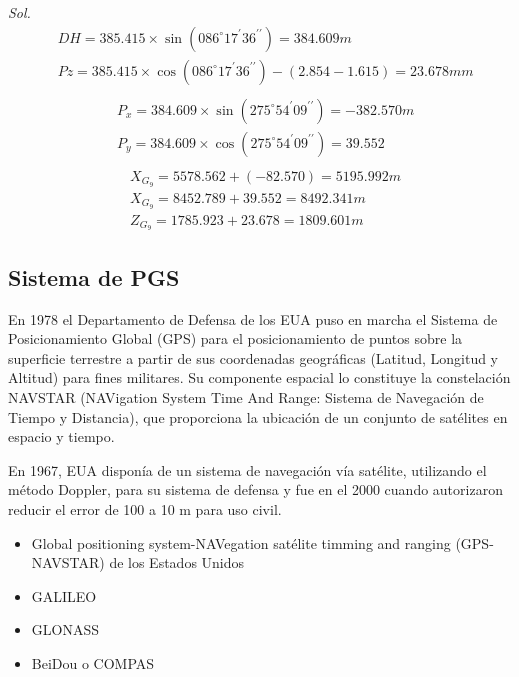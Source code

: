\textit{ Sol. }
\begin{align*}
    &DH = 385.415 \times \sin{(086^{\circ} 17^{\prime} 36^{\prime\prime})} = 384.609m\\
    &Pz = 385.415 \times \cos{(086^{\circ} 17^{\prime} 36^{\prime\prime})} -(2.854 - 1.615) = 23.678mm\\
\end{align*}
\begin{align*}
    &P_x = 384.609 \times \sin{(275^{\circ} 54^{\prime} 09^{\prime\prime})} = - 382.570m\\
    &P_y = 384.609 \times \cos{(275^{\circ} 54^{\prime} 09^{\prime\prime})} = 39.552\\
\end{align*}
\begin{align*}
    &X_{G_9} = 5578.562 +( - 82.570) = 5195.992m\\
    &X_{G_9} = 8452.789 + 39.552 = 8492.341m\\
    &Z_{G_9} = 1785.923 + 23.678 =1809.601m
\end{align*}



\subsection{Sistema de PGS}

En 1978 el Departamento de Defensa de los EUA puso en marcha el Sistema de Posicionamiento Global (GPS) para el posicionamiento de puntos sobre la superficie terrestre a partir de sus coordenadas geográficas (Latitud, Longitud y Altitud) para fines militares.
Su componente espacial lo constituye la constelación NAVSTAR (NAVigation System Time And Range: Sistema de Navegación de Tiempo y Distancia), que proporciona la ubicación de un conjunto de satélites en espacio y tiempo.

En 1967, EUA disponía de un sistema de navegación vía satélite, utilizando el método Doppler, para su sistema de defensa y fue en el 2000 cuando autorizaron reducir el error de 100 a 10 m para uso civil.

\begin{itemize}
    \item Global positioning system-NAVegation satélite timming and ranging (GPS- NAVSTAR) de los Estados Unidos
    \item GALILEO
    \item GLONASS
    \item BeiDou o COMPAS
\end{itemize}

